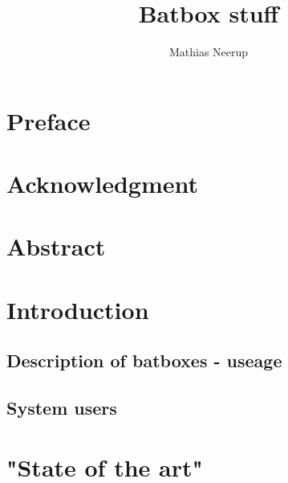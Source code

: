 \documentclass[10pt,a4paper]{article}
\author{Mathias Neerup}
\title{Batbox stuff}
\begin{document}
\maketitle
\tableofcontents


\section{Preface}
\section{Acknowledgment}
\section{Abstract}

\section{Introduction}
\subsection{Description of batboxes - useage}
\subsection{System users}

\section{"State of the art"}
\end{document}
